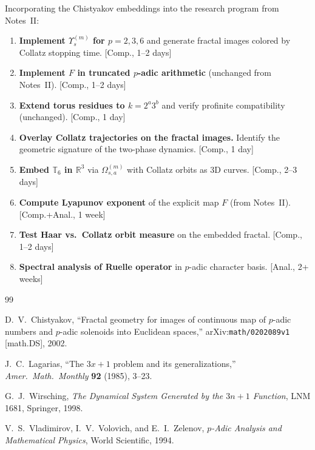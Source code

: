 \documentclass[11pt,a4paper]{article}
\newcommand{\R}{\mathbb{R}}
\newcommand{\T}{\mathbb{T}}
\theoremstyle{plain}
\theoremstyle{definition}
\begin{document}
Incorporating the Chistyakov embeddings into the research program from Notes~II:

\begin{enumerate}
    \item \textbf{Implement $\Upsilon_s^{(m)}$ for $p = 2, 3, 6$} and generate fractal images colored by Collatz stopping time. [Comp., 1--2 days]

    \item \textbf{Implement $F$ in truncated $p$-adic arithmetic} (unchanged from Notes~II). [Comp., 1--2 days]

    \item \textbf{Extend torus residues to $k = 2^a 3^b$} and verify profinite compatibility (unchanged). [Comp., 1 day]

    \item \textbf{Overlay Collatz trajectories on the fractal images.} Identify the geometric signature of the two-phase dynamics. [Comp., 1 day]

    \item \textbf{Embed $\T_6$ in $\R^3$} via $\Omega_{s,a}^{(m)}$ with Collatz orbits as $3$D curves. [Comp., 2--3 days]

    \item \textbf{Compute Lyapunov exponent} of the explicit map $F$ (from Notes~II). [Comp.+Anal., 1 week]

    \item \textbf{Test Haar vs.\ Collatz orbit measure} on the embedded fractal. [Comp., 1--2 days]

    \item \textbf{Spectral analysis of Ruelle operator} in $p$-adic character basis. [Anal., 2+ weeks]
\end{enumerate}



\begin{thebibliography}{99}

D.~V.~Chistyakov,
``Fractal geometry for images of continuous map of $p$-adic numbers and $p$-adic solenoids into Euclidean spaces,''
arXiv:\texttt{math/0202089v1} [math.DS], 2002.

J.~C.~Lagarias,
``The $3x+1$ problem and its generalizations,''
\emph{Amer.\ Math.\ Monthly} \textbf{92} (1985), 3--23.

G.~J.~Wirsching,
\emph{The Dynamical System Generated by the $3n+1$ Function},
LNM 1681, Springer, 1998.

V.~S.~Vladimirov, I.~V.~Volovich, and E.~I.~Zelenov,
\emph{$p$-Adic Analysis and Mathematical Physics},
World Scientific, 1994.

\end{thebibliography}
\end{document}
